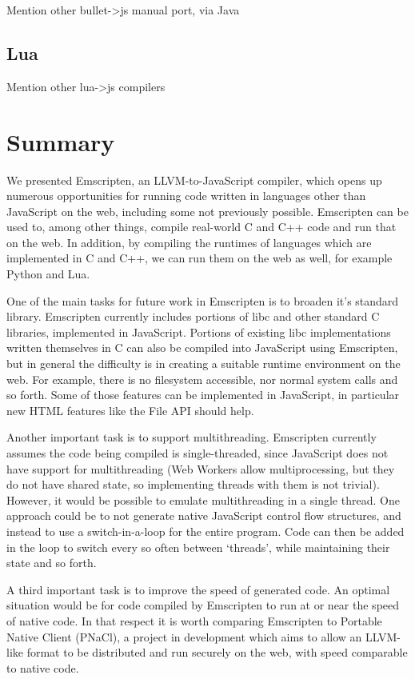 \documentclass[11pt]{proc}
\begin{document}
Mention other bullet->js manual port, via Java

\subsection{Lua}

Mention other lua->js compilers

\section{Summary}

We presented Emscripten, an LLVM-to-JavaScript compiler, which opens up
numerous opportunities for running code written in languages other
than JavaScript on the web, including some not previously possible.
Emscripten can be used to, among other
things, compile real-world C and C++ code and run that on the web. In
addition, by compiling the runtimes of languages which are implemented in C and C++,
we can run them on the web as well, for example Python and Lua.

One of the main tasks for future work in Emscripten is to broaden it's
standard library. Emscripten currently includes portions of libc and
other standard C libraries, implemented in JavaScript. Portions of
existing libc implementations written themselves in C can also be
compiled into JavaScript using Emscripten, but in general the difficulty
is in creating a suitable runtime environment on the web. For example,
there is no filesystem accessible, nor normal system calls and so forth.
Some of those features can be implemented in JavaScript, in particular
new HTML features like the File API should help.

Another important task is to support multithreading. Emscripten
currently assumes the code being compiled is single-threaded, since
JavaScript does not have support for multithreading (Web Workers allow
multiprocessing, but they do not have shared state, so implementing
threads with them is not trivial). However, it would be possible
to emulate multithreading in a single thread. One approach could be
to not generate native JavaScript control flow structures, and instead
to use a switch-in-a-loop for the entire program. Code can then be
added in the loop to switch every so often between `threads', while
maintaining their state and so forth.

A third important task is to improve the speed of generated code. An
optimal situation would be for code compiled by Emscripten to run at
or near the speed of native code. In that respect it is worth comparing
Emscripten to Portable Native Client (PNaCl), a project in development which aims
to allow an LLVM-like format to be distributed and run securely
on the web, with speed comparable to native code.
\end{document}
